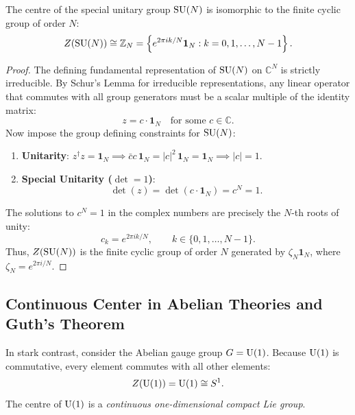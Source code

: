 \begin{proposition}
\label{prop:sun_center_discrete}
The centre of the special unitary group $\mathrm{SU}(N)$ is isomorphic to the finite cyclic group of order $N$:
\begin{equation}
\label{eq:ch10_center_isomorphism}
Z(\mathrm{SU}(N)) \cong \mathbb{Z}_N = \left\{ e^{2\pi i k / N} \mathbf{1}_N : k = 0, 1, \dots, N-1 \right\}.
\end{equation}
\end{proposition}

\begin{proof}
The defining fundamental representation of $\mathrm{SU}(N)$ on $\mathbb{C}^N$ is strictly irreducible. By Schur's Lemma for irreducible representations, any linear operator that commutes with all group generators must be a scalar multiple of the identity matrix:
\begin{equation}
z = c \cdot \mathbf{1}_N \quad \text{for some } c \in \mathbb{C}.
\end{equation}
Now impose the group defining constraints for $\mathrm{SU}(N)$:
\begin{enumerate}
    \item \textbf{Unitarity}: $z^\dagger z = \mathbf{1}_N \implies \bar{c} c \, \mathbf{1}_N = |c|^2 \, \mathbf{1}_N = \mathbf{1}_N \implies |c| = 1$.
    \item \textbf{Special Unitarity ($\det = 1$)}: 
    \begin{equation}
    \det(z) = \det(c \cdot \mathbf{1}_N) = c^N = 1.
    \end{equation}
\end{enumerate}
The solutions to $c^N = 1$ in the complex numbers are precisely the $N$-th roots of unity:
\begin{equation}
c_k = e^{2\pi i k / N}, \qquad k \in \{0, 1, \dots, N-1\}.
\end{equation}
Thus, $Z(\mathrm{SU}(N))$ is the finite cyclic group of order $N$ generated by $\zeta_N \mathbf{1}_N$, where $\zeta_N = e^{2\pi i / N}$.
\end{proof}

\subsection{Continuous Center in Abelian Theories and Guth's Theorem}
\label{subsec:guth_theorem_discussion}

In stark contrast, consider the Abelian gauge group $G = \mathrm{U}(1)$. Because $\mathrm{U}(1)$ is commutative, every element commutes with all other elements:
\begin{equation}
Z(\mathrm{U}(1)) = \mathrm{U}(1) \cong S^1.
\end{equation}
The centre of $\mathrm{U}(1)$ is a \emph{continuous one-dimensional compact Lie group}.

